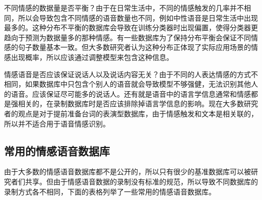 不同情感的数据量是否平衡？由于在日常生活中，不同的情感触发的几率并不相同，所以会导致包含不同情感的语音数量也不同，例如中性语音是日常生活中出现最多的。这种分布不平衡的数据库会导致在训练分类器时出现偏置，使得分类器更趋向于预测为数据量多的那种情感。有一些数据库为了保持分布平衡会保证不同情感的句子数量基本一致。但大多数研究者认为这种分布正体现了实际应用场景的情感出现概率，所以应该通过调整模型来包含这种信息。

情感语音是否应该保证说话人以及说话内容无关？由于不同的人表达情感的方式不相同，如果数据库中只包含个别人的语音就会导致模型不够强健，无法识别其他人的语音。应该保证尽可能多的说话人。还有就是语音中的语言学信息通常和情感都是强相关的，在录制数据库时是否应该排除掉语言学信息的影响。现在大多数研究者的观点是对于提前准备台词的表演型数据库，由于情感触发和文本是相关联的，所以并不适合用于语音情感识别。

\subsection{常用的情感语音数据库}
\label{ssec:available_database}
由于大多数的情感语音数据库都不是公开的，所以只有很少的基准数据库可以被研究者们共享。但由于情感语音数据的录制没有标准的规范，所以导致不同数据库的录制方式各不相同，下面的表格列举了一些常用的情感语音数据库。

